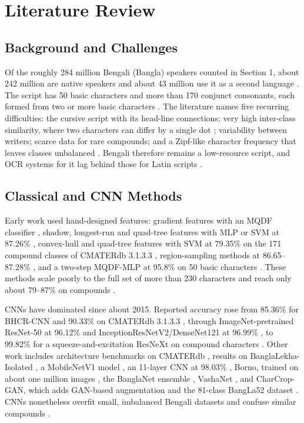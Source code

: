 \hypertarget{literature-review}{%
\section{Literature Review}\label{literature-review}}

\subsection{Background and Challenges}\label{background}

Of the roughly 284 million Bengali (Bangla) speakers counted in Section 1, about 242 million are native speakers and about 43 million use it as a second language \citep{ekushnetnote}. The script has 50 basic characters and more than 170 conjunct consonants, each formed from two or more basic characters \citep{ref7}. The literature names five recurring difficulties: the cursive script with its head-line connections; very high inter-class similarity, where two characters can differ by a single dot \citep{ref32}; variability between writers; scarce data for rare compounds; and a Zipf-like character frequency that leaves classes unbalanced \citep{ref33}. Bengali therefore remains a low-resource script, and OCR systems for it lag behind those for Latin scripts \citep{ref21,ref26}.

\subsection{Classical and CNN Methods}\label{classical-and-cnn-methods}

Early work used hand-designed features: gradient features with an MQDF classifier \citep{ref1}, shadow, longest-run and quad-tree features with MLP or SVM at 87.26\% \citep{ref2}, convex-hull and quad-tree features with SVM at 79.35\% on the 171 compound classes of CMATERdb 3.1.3.3 \citep{ref3}, region-sampling methods at 86.65--87.28\% \citep{ref4,ref5}, and a two-step MQDF-MLP at 95.8\% on 50 basic characters \citep{ref6}. These methods scale poorly to the full set of more than 230 characters and reach only about 79--87\% on compounds \citep{ref26}.

CNNs have dominated since about 2015. Reported accuracy rose from 85.36\% for BHCR-CNN \citep{ref7} and 90.33\% on CMATERdb 3.1.3.3 \citep{ref9}, through ImageNet-pretrained ResNet-50 at 96.12\% \citep{ref11} and InceptionResNetV2/DenseNet121 at 96.99\% \citep{ref12}, to 99.82\% for a squeeze-and-excitation ResNeXt on compound characters \citep{ref16}. Other work includes architecture benchmarks on CMATERdb \citep{ref8,ref58}, results on BanglaLekha-Isolated \citep{ref10}, a MobileNetV1 model \citep{ref13}, an 11-layer CNN at 98.03\% \citep{ref14}, Borno, trained on about one million images \citep{ref15}, the BanglaNet ensemble \citep{ref35}, VashaNet \citep{ref36}, and CharCrop-GAN, which adds GAN-based augmentation and the 81-class BangLa52 dataset \citep{ref37}. CNNs nonetheless overfit small, imbalanced Bengali datasets and confuse similar compounds \citep{ref17,ref23}.

